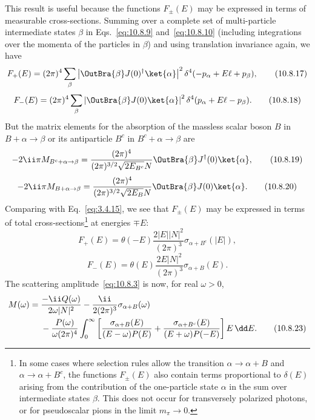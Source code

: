 This result is useful because the functions $F_\pm(E)$ may be expressed
in terms of measurable cross-sections. Summing over a complete set of
multi-particle intermediate states $\beta$ in Eqs.~\eqref{eq:10.8.9}
and~\eqref{eq:10.8.10} (including integrations over the momenta of the
particles in $\beta$) and using translation invariance again, we have
\begin{equation}
  F_+(E)=(2\pi)^4\sum_\beta
  \left|\OutBra{\beta}J(0)^\dagger\ket{\alpha}\right|^2
  \delta^4(-p_\alpha+E\ell+p_\beta),
  \tag{10.8.17}\label{eq:10.8.17}
\end{equation}
\begin{equation}
  F_-(E)=(2\pi)^4\sum_\beta
  \left|\OutBra{\beta}J(0)\ket{\alpha}\right|^2
  \delta^4(p_\alpha+E\ell-p_\beta).
  \tag{10.8.18}\label{eq:10.8.18}
\end{equation}
But the matrix elements for the absorption of the massless scalar boson
$B$ in $B+\alpha\to\beta$ or its antiparticle $B^c$ in
$B^c+\alpha\to\beta$ are
\begin{equation}
  -2\ii\pi M_{B^c+\alpha\to\beta}
  =\frac{(2\pi)^4}{(2\pi)^{3/2}\sqrt{2E_{B^c}}N}
  \OutBra{\beta}J^\dagger(0)\ket{\alpha},
  \tag{10.8.19}\label{eq:10.8.19}
\end{equation}
\begin{equation}
  -2\ii\pi M_{B+\alpha\to\beta}
  =\frac{(2\pi)^4}{(2\pi)^{3/2}\sqrt{2E_B}N}
  \OutBra{\beta}J(0)\ket{\alpha}.
  \tag{10.8.20}\label{eq:10.8.20}
\end{equation}
Comparing with Eq.~\eqref{eq:3.4.15}, we see that $F_\pm(E)$ may be
expressed in terms of total cross-sections\footnote{In some cases where
selection rules allow the transition $\alpha\to\alpha+B$ and
$\alpha\to\alpha+B^c$, the functions $F_\pm(E)$ also contain terms
proportional to $\delta(E)$ arising from the contribution of the one-particle
state $\alpha$ in the sum over intermediate states $\beta$. This does not
occur for transversely polarized photons, or for pseudoscalar pions in the
limit $m_\pi\to0$.} at energies $\mp E$:
\begin{equation}
  F_+(E)=\theta(-E)\frac{2|E||N|^2}{(2\pi)^3}
  \sigma_{\alpha+B^c}(|E|),
  \tag{10.8.21}\label{eq:10.8.21}
\end{equation}
\begin{equation}
  F_-(E)=\theta(E)\frac{2E|N|^2}{(2\pi)^3}
  \sigma_{\alpha+B}(E).
  \tag{10.8.22}\label{eq:10.8.22}
\end{equation}
The scattering amplitude~\eqref{eq:10.8.3} is now, for real $\omega>0$,
\begin{align}
  M(\omega)={}&\frac{-\ii Q(\omega)}{2\omega|N|^2}
  -\frac{\ii}{2(2\pi)^3}\sigma_{\alpha+B}(\omega)\notag\\
  &{}-\frac{P(\omega)}{\omega(2\pi)^4}\int_0^\infty
  \left[\frac{\sigma_{\alpha+B}(E)}{(E-\omega)P(E)}
  +\frac{\sigma_{\alpha+B^c}(E)}{(E+\omega)P(-E)}\right]E\,\dd E.
  \tag{10.8.23}\label{eq:10.8.23}
\end{align}
